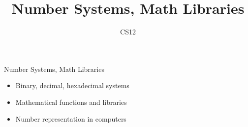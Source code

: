 \documentclass{beamer}
\title{Number Systems, Math Libraries}
\author{CS12}
\date{}
\begin{document}
\begin{frame}
    \titlepage
\end{frame}

\begin{frame}{Number Systems, Math Libraries}
    \begin{itemize}
        \item Binary, decimal, hexadecimal systems
        \item Mathematical functions and libraries
        \item Number representation in computers
    \end{itemize}
\end{frame}
\end{document}
